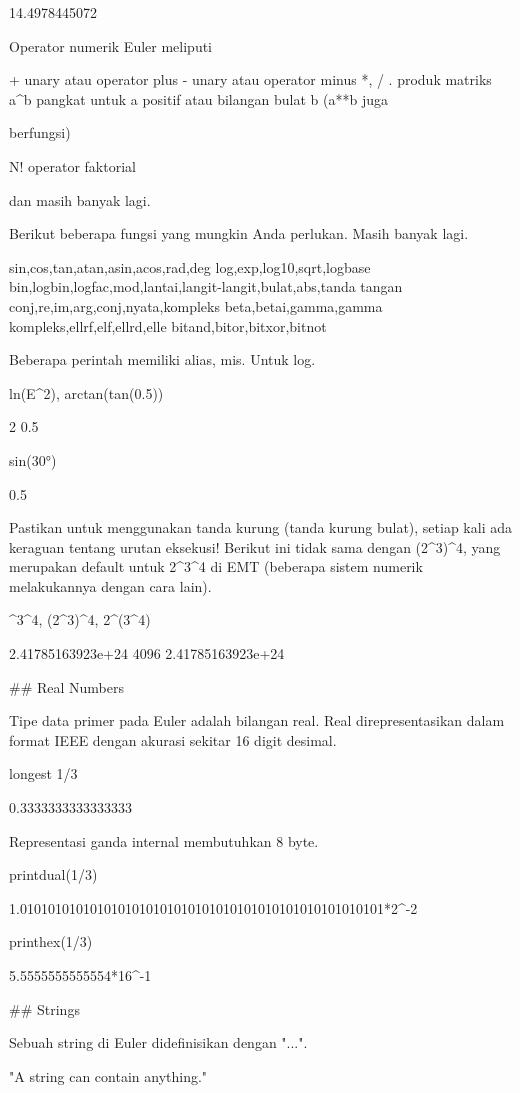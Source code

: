 \documentclass{article}
\begin{document}
    14.4978445072

Operator numerik Euler meliputi


 + unary atau operator plus  
 - unary atau operator minus  
 *, /  
 . produk matriks  
 a^b pangkat untuk a positif atau bilangan bulat b (a**b juga  

berfungsi)


 N! operator faktorial


dan masih banyak lagi.


Berikut beberapa fungsi yang mungkin Anda perlukan. Masih banyak lagi.


 sin,cos,tan,atan,asin,acos,rad,deg  
 log,exp,log10,sqrt,logbase  
 bin,logbin,logfac,mod,lantai,langit-langit,bulat,abs,tanda tangan  
 conj,re,im,arg,conj,nyata,kompleks  
 beta,betai,gamma,gamma kompleks,ellrf,elf,ellrd,elle  
 bitand,bitor,bitxor,bitnot  

Beberapa perintah memiliki alias, mis. Untuk log.


\>ln(E^2), arctan(tan(0.5))


    2
    0.5

\>sin(30°)


    0.5

Pastikan untuk menggunakan tanda kurung (tanda kurung bulat), setiap
kali ada keraguan tentang urutan eksekusi! Berikut ini tidak sama
dengan (2^3)^4, yang merupakan default untuk 2^3^4 di EMT (beberapa
sistem numerik melakukannya dengan cara lain).


^3^4, (2^3)^4, 2^(3^4)


    2.41785163923e+24
    4096
    2.41785163923e+24

## Real Numbers

Tipe data primer pada Euler adalah bilangan real. Real
direpresentasikan dalam format IEEE dengan akurasi sekitar 16 digit
desimal.


\>longest 1/3


         0.3333333333333333 

Representasi ganda internal membutuhkan 8 byte.


\>printdual(1/3)


    1.0101010101010101010101010101010101010101010101010101*2^-2

\>printhex(1/3)


    5.5555555555554*16^-1

## Strings

Sebuah string di Euler didefinisikan dengan "...".


\>"A string can contain anything."
\end{document}
